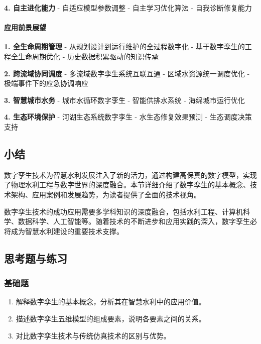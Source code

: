 \textbf{4. 自主进化能力} - 自适应模型参数调整 - 自主学习优化算法 - 自我诊断修复能力

\paragraph{应用前景展望}\label{ux5e94ux7528ux524dux666fux5c55ux671b}

\textbf{1. 全生命周期管理} - 从规划设计到运行维护的全过程数字化 - 基于数字孪生的工程全生命周期优化 - 历史数据积累驱动的知识传承

\textbf{2. 跨流域协同调度} - 多流域数字孪生系统互联互通 - 区域水资源统一调度优化 - 极端事件下的应急协调响应

\textbf{3. 智慧城市水务} - 城市水循环数字孪生 - 智能供排水系统 - 海绵城市运行优化

\textbf{4. 生态环境保护} - 河湖生态系统数字孪生 - 水生态修复效果预测 - 生态调度决策支持

\subsection{小结}\label{ux5c0fux7ed3-5}

数字孪生技术为智慧水利发展注入了新的活力，通过构建高保真的数字模型，实现了物理水利工程与数字世界的深度融合。本节详细介绍了数字孪生的基本概念、技术架构、应用案例和发展趋势，为读者提供了全面的技术视角。

数字孪生技术的成功应用需要多学科知识的深度融合，包括水利工程、计算机科学、数据科学、人工智能等。随着技术的不断进步和应用实践的深入，数字孪生必将成为智慧水利建设的重要技术支撑。

\subsection{思考题与练习}\label{ux601dux8003ux9898ux4e0eux7ec3ux4e60-7}

\subsubsection{基础题}\label{ux57faux7840ux9898-7}

\begin{enumerate}
\def\labelenumi{\arabic{enumi}.}
\tightlist
\item
  解释数字孪生的基本概念，分析其在智慧水利中的应用价值。
\item
  描述数字孪生五维模型的组成要素，说明各要素之间的关系。
\item
  对比数字孪生技术与传统仿真技术的区别与优势。
\end{enumerate}

